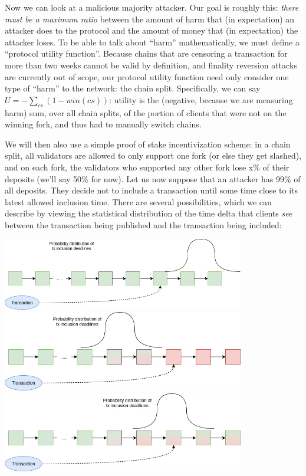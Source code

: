 \documentclass[12pt]{article}
\begin{document}
Now we can look at a malicious majority attacker. Our goal is roughly this: \textit{there must be a maximum ratio} between the amount of harm that (in expectation) an attacker does to the protocol and the amount of money that (in expectation) the attacker loses. To be able to talk about ``harm'' mathematically, we must define a ``protocol utility function''. Because chains that are censoring a transaction for more than two weeks cannot be valid by definition, and finality reversion attacks are currently out of scope, our protocol utility function need only consider one type of ``harm'' to the network: the chain split. Specifically, we can say $U = -\sum_{cs} (1 - win(cs))$: utility is the (negative, because we are measuring harm) sum, over all chain splits, of the portion of clients that were not on the winning fork, and thus had to manually switch chains.

We will then also use a simple proof of stake incentivization scheme: in a chain split, all validators are allowed to only support one fork (or else they get slashed), and on each fork, the validators who supported any other fork lose x\% of their deposits (we'll say 50\% for now). Let us now suppose that an attacker has 99\% of all deposits. They decide not to include a transaction until some time close to its latest allowed inclusion time. There are several possibilities, which we can describe by viewing the statistical distribution of the time delta that clients \textit{see} between the transaction being published and the transaction being included:

\includegraphics[width=400px]{Censorship6b.png}
\includegraphics[width=400px]{Censorship6.png}
\includegraphics[width=400px]{Censorship6c.png}
\end{document}
